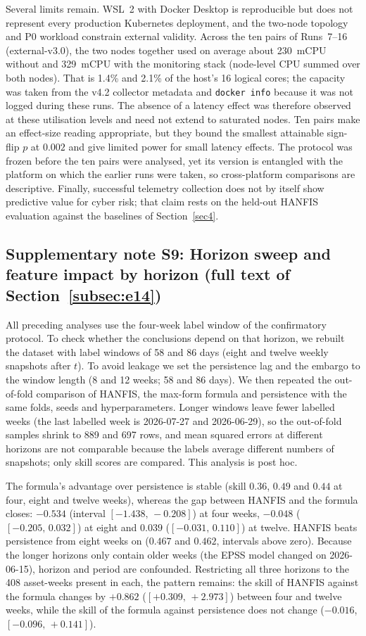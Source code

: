 \documentclass[pdflatex,sn-basic]{sn-jnl}
\theoremstyle{thmstyleone}%
\theoremstyle{thmstyletwo}%
\theoremstyle{thmstylethree}%
\begin{document}
Several limits remain. WSL~2 with Docker Desktop is reproducible but does not represent every production Kubernetes deployment, and the two-node topology and P0 workload constrain external validity. Across the ten pairs of Runs~7--16 (external-v3.0), the two nodes together used on average about 230~mCPU without and 329~mCPU with the monitoring stack (node-level CPU summed over both nodes). That is 1.4\% and 2.1\% of the host's 16 logical cores; the capacity was taken from the v4.2 collector metadata and \texttt{docker info} because it was not logged during these runs. The absence of a latency effect was therefore observed at these utilisation levels and need not extend to saturated nodes. Ten pairs make an effect-size reading appropriate, but they bound the smallest attainable sign-flip $p$ at $0.002$ and give limited power for small latency effects. The protocol was frozen before the ten pairs were analysed, yet its version is entangled with the platform on which the earlier runs were taken, so cross-platform comparisons are descriptive. Finally, successful telemetry collection does not by itself show predictive value for cyber risk; that claim rests on the held-out HANFIS evaluation against the baselines of Section~\ref{sec4}.

\subsection*{Supplementary note S9: Horizon sweep and feature impact by horizon (full text of Section~\ref{subsec:e14})}
All preceding analyses use the four-week label window of the confirmatory protocol. To check whether the conclusions depend on that horizon, we rebuilt the dataset with label windows of 58 and 86 days (eight and twelve weekly snapshots after $t$). To avoid leakage we set the persistence lag and the embargo to the window length (8 and 12 weeks; 58 and 86 days). We then repeated the out-of-fold comparison of HANFIS, the max-form formula and persistence with the same folds, seeds and hyperparameters. Longer windows leave fewer labelled weeks (the last labelled week is 2026-07-27 and 2026-06-29), so the out-of-fold samples shrink to 889 and 697 rows, and mean squared errors at different horizons are not comparable because the labels average different numbers of snapshots; only skill scores are compared. This analysis is post hoc.

The formula's advantage over persistence is stable (skill $0.36$, $0.49$ and $0.44$ at four, eight and twelve weeks), whereas the gap between HANFIS and the formula closes: $-0.534$ (interval $[-1.438,\,-0.208]$) at four weeks, $-0.048$ ($[-0.205,\,0.032]$) at eight and $0.039$ ($[-0.031,\,0.110]$) at twelve. HANFIS beats persistence from eight weeks on ($0.467$ and $0.462$, intervals above zero). Because the longer horizons only contain older weeks (the EPSS model changed on 2026-06-15), horizon and period are confounded. Restricting all three horizons to the 408 asset-weeks present in each, the pattern remains: the skill of HANFIS against the formula changes by $+0.862$ ($[+0.309,\,+2.973]$) between four and twelve weeks, while the skill of the formula against persistence does not change ($-0.016$, $[-0.096,\,+0.141]$).
\end{document}
